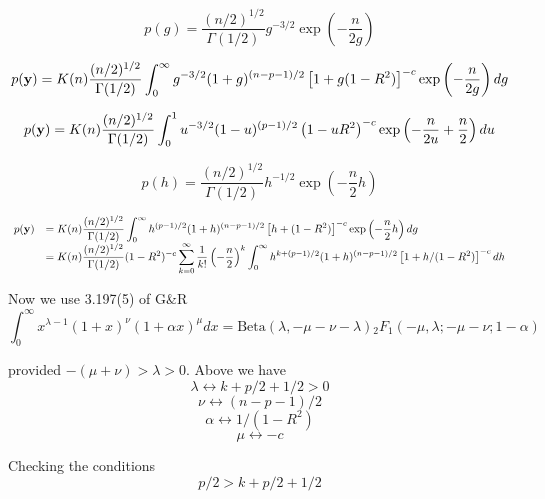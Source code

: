 \documentclass{article}[12pt]
\begin{document}
$$
p(g) = \frac{(n/2)^{1/2}}{\Gamma(1/2)} g^{-3/2} \exp\left( -\frac{n}{2g} \right)
$$


$$
\displaystyle p({\bf y})
= K(n) \frac{(n/2)^{1/2}}{\Gamma(1/2)}
\int_0^\infty g^{-3/2}
(1 + g)^{(n-p-1)/2}\left[ 1 + g (1 - R^2) \right]^{-c}  \exp\left( -\frac{n}{2g} \right) dg
$$


$$
\displaystyle p({\bf y})
= K(n) \frac{(n/2)^{1/2}}{\Gamma(1/2)}
\int_0^1  u^{-3/2}
(1 - u)^{ (p-1)/2}\left(  1   - uR^2 \right)^{-c}  \exp\left( -\frac{n}{2u}  + \frac{n}{2} \right) du
$$

$$
p(h) = \frac{(n/2)^{1/2}}{\Gamma(1/2)} h^{-1/2} \exp\left( -\frac{n}{2}h \right)
$$


$$
\begin{array}{rl} 
\ds p(\vy)
& \ds = K(n) \frac{(n/2)^{1/2}}{\Gamma(1/2)}
\int_0^\infty h^{(p-1)/2 }
(1 + h)^{(n-p-1)/2}\left[ h +  (1 - R^2) \right]^{-c}  \exp\left( -\frac{n}{2}h \right) dg
\\
& \ds = K(n) \frac{(n/2)^{1/2}}{\Gamma(1/2)} (1 - R^2)^{-c}
\sum_{k=0}^\infty \frac{1}{k!} \left( -\frac{n}{2} \right)^k \int_0^\infty h^{k + (p - 1)/2 }
(1 + h)^{(n-p-1)/2} \left[ 1 + h/(1 - R^2) \right]^{-c}   dh
 
\end{array} 
$$

\noindent Now we use 3.197(5) of G\&R
$$
\int_0^\infty x^{\lambda-1} (1 + x)^{\nu}(1 + \alpha x)^{\mu} dx
= \mbox{Beta}(\lambda,-\mu-\nu-\lambda) {}_2 F_1(-\mu,\lambda;-\mu-\nu;1-\alpha)
$$

\noindent provided $-(\mu+\nu) > \lambda > 0$. Above we have
$$
\lambda \leftrightarrow k + p/2 + 1/2 >0
$$
$$
\nu \leftrightarrow (n-p-1)/2
$$
$$
\alpha \leftrightarrow 1/(1 - R^2)
$$
$$
\mu \leftrightarrow - c
$$

\noindent Checking the conditions
$$
p/2 >   k + p/2 + 1/2 
$$





\end{document}
